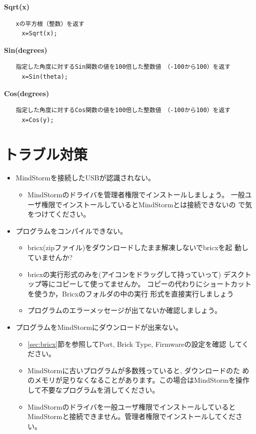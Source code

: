 \documentclass[11pt]{jarticle}
\begin{document}
{\large \textbf{
Sqrt(x)}
}
\begin{verbatim}
　　xの平方根（整数）を返す
　　　x=Sqrt(x);
\end{verbatim}


{\large \textbf{
Sin(degrees)}
}
\begin{verbatim}
　　指定した角度に対するSin関数の値を100倍した整数値　（-100から100）を返す
　　　x=Sin(theta);
\end{verbatim}

{\large \textbf{
Cos(degrees)}
}
\begin{verbatim}
　　指定した角度に対するCos関数の値を100倍した整数値　（-100から100）を返す
　　　x=Cos(y);
\end{verbatim}

\section{トラブル対策}
\begin{itemize}
\item MindStormを接続したUSBが認識されない。
  \begin{itemize}
  \item MindStormのドライバを管理者権限でインストールしましょう。
    一般ユーザ権限でインストールしているとMindStormとは接続できないの
    で気をつけてください。
  \end{itemize}
\item プログラムをコンパイルできない。
  \begin{itemize}
  \item bricx(zipファイル)をダウンロードしたまま解凍しないでbricxを起
    動していませんか?
  \item bricxの実行形式のみを(アイコンをドラッグして持っていって)
    デスクトップ等にコピーして使ってませんか。
    コピーの代わりにショートカットを使うか，Bricxのフォルダの中の実行
    形式を直接実行しましょう
  \item プログラムのエラーメッセージが出てないか確認しましょう。
  \end{itemize}
\item プログラムをMindStormにダウンロードが出来ない。
  \begin{itemize}
  \item \ref{sec:bricx}節を参照してPort, Brick Type, Firmwareの設定を確認
    してください。
  \item MindStormに古いプログラムが多数残っていると, ダウンロードのた
    めのメモリが足りなくなることがあります。この場合はMindStormを操作
    して不要なプログラムを消してください。
  \item MindStormのドライバを一般ユーザ権限でインストールしていると
    MindStormと接続できません。管理者権限でインストールしてください。
  \end{itemize}
\end{itemize}

\printindex
\end{document}
